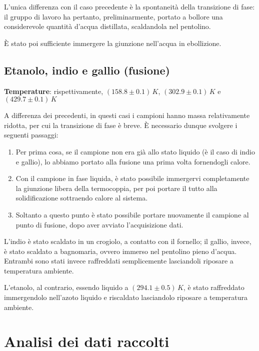 \documentclass{article}
\begin{document}
L'unica differenza con il caso precedente è la spontaneità
della transizione di fase:
il gruppo di lavoro ha pertanto, preliminarmente, portato
a bollore una considerevole quantità d'acqua distillata,
scaldandola nel pentolino.

È stato poi sufficiente immergere la giunzione nell'acqua
in ebollizione.

\pagebreak
\subsection*{Etanolo, indio e gallio (fusione)}
\textbf{Temperature}: rispettivamente, $(158.8\pm0.1)\,\unit{K}$,
$(302.9\pm0.1)\,\unit{K}$ e $(429.7\pm0.1)\,\unit{K}$
\vspace{1mm}

A differenza dei precedenti, in questi casi i campioni
hanno massa relativamente ridotta, per cui la transizione
di fase è breve. È necessario dunque svolgere i seguenti passaggi:
\begin{enumerate}
  \item
    Per prima cosa, se il campione non era già allo stato liquido
    (è il caso di indio e gallio), lo abbiamo portato alla fusione
    una prima volta fornendogli calore.
  \item
    Con il campione in fase liquida, è stato possibile immergervi
    completamente la giunzione libera della termocoppia, per poi
    portare il tutto alla solidificazione sottraendo calore al
    sistema.
  \item
    Soltanto a questo punto è stato possibile portare nuovamente
    il campione al punto di fusione, dopo aver avviato l'acquisizione
    dati.
\end{enumerate}
L'indio è stato scaldato in un crogiolo, a contatto con il
fornello; il gallio, invece, è stato scaldato a bagnomaria,
ovvero immerso nel pentolino pieno d'acqua.
Entrambi sono stati invece raffreddati semplicemente
lasciandoli riposare a temperatura ambiente.

L'etanolo, al contrario, essendo liquido a $(294.1\pm0.5)\,\unit{K}$,
è stato raffreddato immergendolo nell'azoto liquido e riscaldato
lasciandolo riposare a temperatura ambiente.


\section{Analisi dei dati raccolti}
\end{document}
